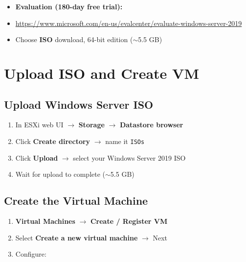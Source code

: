 ﻿\documentclass[12pt,a4paper]{article}
\begin{document}
\begin{itemize}
    \item \textbf{Evaluation (180-day free trial):}
    \item \url{https://www.microsoft.com/en-us/evalcenter/evaluate-windows-server-2019}
    \item Choose \textbf{ISO} download, 64-bit edition ($\sim$5.5 GB)
\end{itemize}

\section{Upload ISO and Create VM}

\subsection{Upload Windows Server ISO}

\begin{enumerate}
    \item In ESXi web UI $\rightarrow$ \textbf{Storage} $\rightarrow$ \textbf{Datastore browser}
    \item Click \textbf{Create directory} $\rightarrow$ name it \texttt{ISOs}
    \item Click \textbf{Upload} $\rightarrow$ select your Windows Server 2019 ISO
    \item Wait for upload to complete ($\sim$5.5 GB)
\end{enumerate}

\subsection{Create the Virtual Machine}

\begin{enumerate}
    \item \textbf{Virtual Machines} $\rightarrow$ \textbf{Create / Register VM}
    \item Select \textbf{Create a new virtual machine} $\rightarrow$ Next
    \item Configure:
\end{enumerate}
\end{document}
